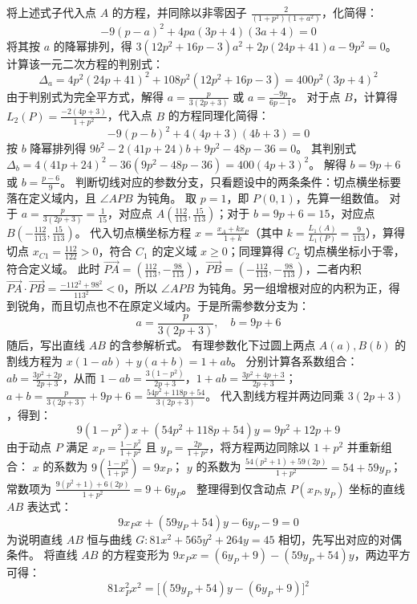 \begin{solution}
将上述式子代入点 $A$ 的方程，并同除以非零因子 $\frac{2}{(1+p^2)(1+a^2)}$，化简得：
$$ -9(p-a)^2 + 4pa(3p+4)(3a+4) = 0 $$
将其按 $a$ 的降幂排列，得 $3(12p^2 + 16p - 3)a^2 + 2p(24p + 41)a - 9p^2 = 0$。
计算该一元二次方程的判别式：
$$ \Delta_a = 4p^2(24p+41)^2 + 108p^2(12p^2+16p-3) = 400p^2(3p+4)^2 $$
由于判别式为完全平方式，解得 $a = \frac{p}{3(2p+3)}$ 或 $a = \frac{-9p}{6p-1}$。
对于点 $B$，计算得 $L_2(P) = \frac{-2(4p+3)}{1+p^2}$，代入点 $B$ 的方程同理化简得：
$$ -9(p-b)^2 + 4(4p+3)(4b+3) = 0 $$
按 $b$ 降幂排列得 $9b^2 - 2(41p + 24)b + 9p^2 - 48p - 36 = 0$。
其判别式 $\Delta_b = 4(41p+24)^2 - 36(9p^2 - 48p - 36) = 400(4p+3)^2$。
解得 $b = 9p + 6$ 或 $b = \frac{p-6}{9}$。
判断切线对应的参数分支，只看题设中的两条条件：切点横坐标要落在定义域内，且 $\angle APB$ 为钝角。
取 $p=1$，即 $P(0,1)$，先算一组数值。
对于 $a = \frac{p}{3(2p+3)} = \frac{1}{15}$，对应点 $A\left(\frac{112}{113}, \frac{15}{113}\right)$；对于 $b = 9p+6 = 15$，对应点 $B\left(-\frac{112}{113}, \frac{15}{113}\right)$。
代入切点横坐标方程 $x = \frac{x_A + k x_P}{1+k}$（其中 $k = \frac{L_1(A)}{L_1(P)} = \frac{9}{113}$），算得切点 $x_{C1} = \frac{112}{122} > 0$，符合 $C_1$ 的定义域 $x \ge 0$；同理算得 $C_2$ 切点横坐标小于零，符合定义域。
此时 $\overrightarrow{PA} = \left(\frac{112}{113}, -\frac{98}{113}\right)$，$\overrightarrow{PB} = \left(-\frac{112}{113}, -\frac{98}{113}\right)$，二者内积 $\overrightarrow{PA} \cdot \overrightarrow{PB} = \frac{-112^2 + 98^2}{113^2} < 0$，所以 $\angle APB$ 为钝角。另一组增根对应的内积为正，得到锐角，而且切点也不在原定义域内。于是所需参数分支为：
$$ a = \frac{p}{3(2p+3)}, \quad b = 9p+6 $$
随后，写出直线 $AB$ 的含参解析式。
有理参数化下过圆上两点 $A(a), B(b)$ 的割线方程为 $x(1-ab) + y(a+b) = 1+ab$。
分别计算各系数组合：
$ab = \frac{3p^2+2p}{2p+3}$，从而 $1-ab = \frac{3(1-p^2)}{2p+3}$，$1+ab = \frac{3p^2+4p+3}{2p+3}$；
$a+b = \frac{p}{3(2p+3)} + 9p+6 = \frac{54p^2+118p+54}{3(2p+3)}$。
代入割线方程并两边同乘 $3(2p+3)$，得到：
$$ 9(1-p^2)x + (54p^2+118p+54)y = 9p^2+12p+9 $$
由于动点 $P$ 满足 $x_P = \frac{1-p^2}{1+p^2}$ 且 $y_P = \frac{2p}{1+p^2}$，将方程两边同除以 $1+p^2$ 并重新组合：
$x$ 的系数为 $9\left(\frac{1-p^2}{1+p^2}\right) = 9x_P$；
$y$ 的系数为 $\frac{54(p^2+1) + 59(2p)}{1+p^2} = 54 + 59y_P$；
常数项为 $\frac{9(p^2+1) + 6(2p)}{1+p^2} = 9 + 6y_P$。
整理得到仅含动点 $P(x_P, y_P)$ 坐标的直线 $AB$ 表达式：
$$ 9x_P x + (59y_P + 54)y - 6y_P - 9 = 0 $$
为说明直线 $AB$ 恒与曲线 $G: 81x^2 + 565y^2 + 264y = 45$ 相切，先写出对应的对偶条件。
将直线 $AB$ 的方程变形为 $9x_P x = (6y_P + 9) - (59y_P + 54)y$，两边平方可得：
$$ 81x_P^2 x^2 = \big[(59y_P + 54)y - (6y_P + 9)\big]^2 $$

\end{solution}

